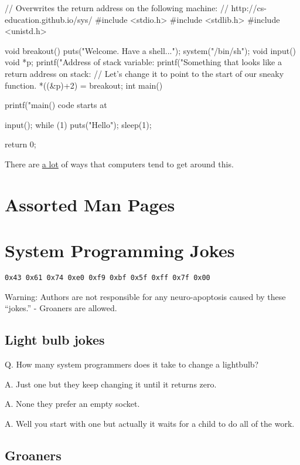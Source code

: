 \begin{code}[language=C]
// Overwrites the return address on the following machine:
// http://cs-education.github.io/sys/
#include <stdio.h>
#include <stdlib.h>
#include <unistd.h>

void breakout() {
    puts("Welcome. Have a shell...");
    system("/bin/sh");
}
void input() {
  void *p;
  printf("Address of stack variable: %
  printf("Something that looks like a return address on stack: %
  // Let's change it to point to the start of our sneaky function.
  *((&p)+2) = breakout;
}
int main() {
    printf("main() code starts at %
    
    input();
    while (1) {
        puts("Hello");
        sleep(1);
    }

    return 0;
}
\end{code}

There are \href{https://en.wikipedia.org/wiki/Stack_buffer_overflow}{a lot} of ways that computers tend to get around this.

\section{Assorted Man Pages}

\section{System Programming Jokes}

\texttt{0x43\ 0x61\ 0x74\ 0xe0\ 0xf9\ 0xbf\ 0x5f\ 0xff\ 0x7f\ 0x00}

Warning: Authors are not responsible for any neuro-apoptosis caused by these ``jokes.'' - Groaners are allowed.

\subsection{Light bulb jokes}

Q. How many system programmers does it take to change a lightbulb?

A. Just one but they keep changing it until it returns zero.

A. None they prefer an empty socket.

A. Well you start with one but actually it waits for a child to do all of the work.

\subsection{Groaners}

